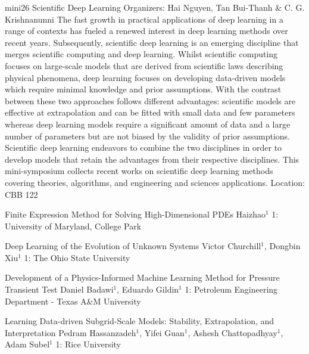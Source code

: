 \mini
{mini26}
{Scientific Deep Learning}
{Organizers: Hai Nguyen, Tan Bui-Thanh \& C. G. Krishnanunni}
{The fast growth in practical applications of deep learning in a range of contexts has fueled a renewed interest in deep learning methods over recent years. Subsequently, scientific deep learning is an emerging discipline that merges scientific computing and deep learning. Whilst scientific computing focuses on large-scale models that are derived from scientific laws describing physical phenomena, deep learning focuses on developing data-driven models which require minimal knowledge and prior assumptions. With the contrast between these two approaches follows different advantages: scientific models are effective at extrapolation and can be fitted with small data and few parameters whereas deep learning models require a significant amount of data and a large number of parameters but are not biased by the validity of prior assumptions. Scientific deep learning endeavors to combine the two disciplines in order to develop models that retain the advantages from their respective disciplines. This mini-symposium collects recent works on scientific deep learning methods covering theories, algorithms, and engineering and sciences applications.}
{Location: CBB 122}

\begin{talks}
\item\talk
{Finite Expression Method for Solving High-Dimensional PDEs}
{Haizhao$^{1}$}
{1: University of Maryland, College Park}
\item\talk
{Deep Learning of the Evolution of Unknown Systems}
{Victor Churchill$^1$, Dongbin Xiu$^1$}
{1: The Ohio State University}
\item\talk
{Development of a Physics-Informed Machine Learning Method for Pressure Transient Test}
{Daniel Badawi$^1$, Eduardo Gildin$^1$}
{1: Petroleum Engineering Department - Texas A\&M University}
\item\talk
{Learning Data-driven Subgrid-Scale Models: Stability, Extrapolation, and Interpretation}
{Pedram Hassanzadeh$^{1}$, Yifei Guan$^{1}$,  Ashesh Chattopadhyay$^{1}$, Adam Subel$^{1}$ }
{1: Rice University}
\end{talks}
\room
